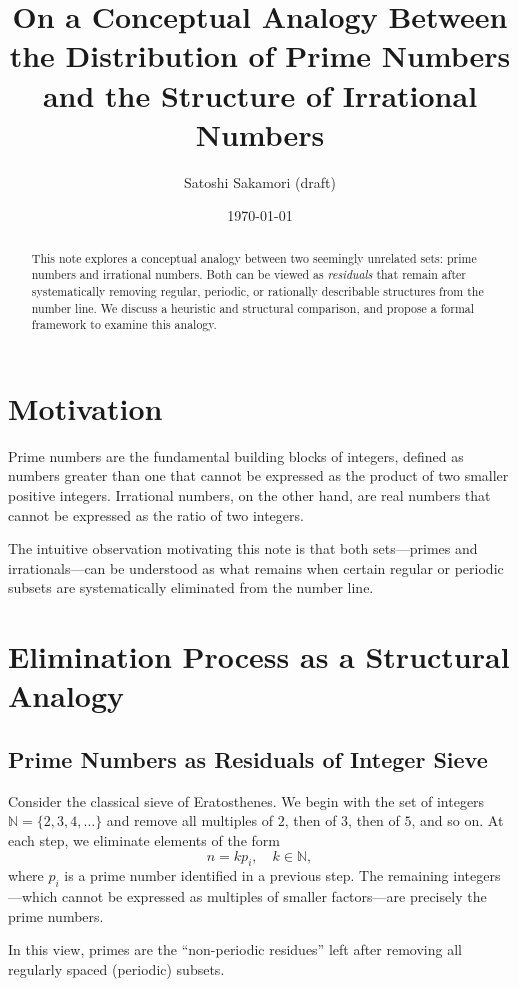 \documentclass[12pt]{article}
\title{On a Conceptual Analogy Between the Distribution of Prime Numbers and the Structure of Irrational Numbers}
\author{Satoshi Sakamori (draft)}
\date{\today}
\begin{document}
\maketitle

\begin{abstract}
This note explores a conceptual analogy between two seemingly unrelated sets: prime numbers and irrational numbers. 
Both can be viewed as \emph{residuals} that remain after systematically removing regular, periodic, or rationally describable structures from the number line. 
We discuss a heuristic and structural comparison, and propose a formal framework to examine this analogy.
\end{abstract}

\section{Motivation}

Prime numbers are the fundamental building blocks of integers, defined as numbers greater than one that cannot be expressed as the product of two smaller positive integers.  
Irrational numbers, on the other hand, are real numbers that cannot be expressed as the ratio of two integers.

The intuitive observation motivating this note is that both sets---primes and irrationals---can be understood as what remains when certain regular or periodic subsets are systematically eliminated from the number line.

\section{Elimination Process as a Structural Analogy}

\subsection{Prime Numbers as Residuals of Integer Sieve}

Consider the classical sieve of Eratosthenes.  
We begin with the set of integers $\mathbb{N} = \{2, 3, 4, \dots\}$ and remove all multiples of $2$, then of $3$, then of $5$, and so on.  
At each step, we eliminate elements of the form
\[
n = k p_i, \quad k \in \mathbb{N},
\]
where $p_i$ is a prime number identified in a previous step.  
The remaining integers---which cannot be expressed as multiples of smaller factors---are precisely the prime numbers.

In this view, primes are the ``non-periodic residues'' left after removing all regularly spaced (periodic) subsets.
\end{document}
